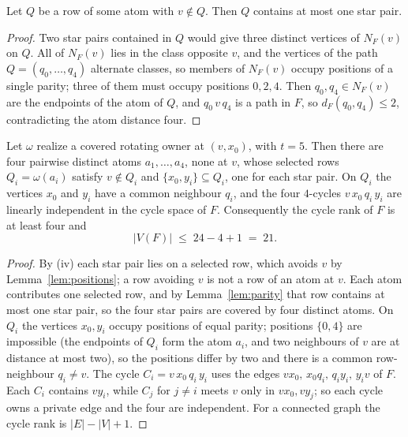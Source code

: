 \begin{lemma}[Parity]\label{lem:parity}
Let \(Q\) be a row of some atom with \(v\notin Q\). Then \(Q\)
contains at most one star pair.
\end{lemma}

\begin{proof}
Two star pairs contained in \(Q\) would give three distinct vertices
of \(N_F(v)\) on \(Q\). All of \(N_F(v)\) lies in the class opposite
\(v\), and the vertices of the path \(Q=(q_0,\dots,q_4)\) alternate
classes, so members of \(N_F(v)\) occupy positions of a single parity;
three of them must occupy positions \(0,2,4\). Then \(q_0,q_4\in
N_F(v)\) are the endpoints of the atom of \(Q\), and
\(q_0\,v\,q_4\) is a path in \(F\), so \(d_F(q_0,q_4)\le2\),
contradicting the atom distance four.
\end{proof}

\begin{corollary}\label{cor:coverage}
Let \(\omega\) realize a covered rotating owner at \((v,x_0)\), with
\(t=5\). Then there are four pairwise distinct atoms
\(a_1,\dots,a_4\), none at \(v\), whose selected rows
\(Q_i=\omega(a_i)\) satisfy \(v\notin Q_i\) and
\(\{x_0,y_i\}\subseteq Q_i\), one for each star pair. On \(Q_i\) the
vertices \(x_0\) and \(y_i\) have a common neighbour \(q_i\), and the
four \(4\)-cycles \(v\,x_0\,q_i\,y_i\) are linearly independent in the
cycle space of \(F\). Consequently the cycle rank of \(F\) is at least
four and
\[
|V(F)|\;\le\;24-4+1\;=\;21 .
\]
\end{corollary}

\begin{proof}
By (iv) each star pair lies on a selected row, which avoids \(v\) by
Lemma~\ref{lem:positions}; a row avoiding \(v\) is not a row of an atom
at \(v\). Each atom contributes one selected row, and by
Lemma~\ref{lem:parity} that row contains at most one star pair, so the
four star pairs are covered by four distinct atoms. On \(Q_i\) the
vertices \(x_0,y_i\) occupy positions of equal parity; positions
\(\{0,4\}\) are impossible (the endpoints of \(Q_i\) form the atom
\(a_i\), and two neighbours of \(v\) are at distance at most two), so
the positions differ by two and there is a common row-neighbour
\(q_i\neq v\). The cycle \(C_i=v\,x_0\,q_i\,y_i\) uses the edges
\(vx_0,\,x_0q_i,\,q_iy_i,\,y_iv\) of \(F\). Each \(C_i\) contains
\(vy_i\), while \(C_j\) for \(j\neq i\) meets \(v\) only in
\(vx_0,vy_j\); so each cycle owns a private edge and the four are
independent. For a connected graph the cycle rank is
\(|E|-|V|+1\).
\end{proof}

